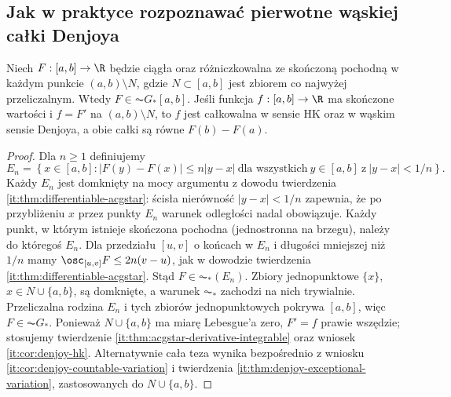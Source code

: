 \subsection{Jak w praktyce rozpoznawać pierwotne wąskiej całki Denjoya}
\begin{twierdzenie}\label{ma1:kh:tw:denjoy-countable}\label{tw:denjoy-countable}
Niech $F:[a,b]\to\R$ będzie ciągła oraz różniczkowalna ze skończoną pochodną w każdym punkcie $(a,b)\setminus N$, gdzie $N\subset[a,b]$ jest zbiorem co najwyżej przeliczalnym. Wtedy $F\in\AC G_*[a,b]$. Jeśli funkcja $f:[a,b]\to\R$ ma skończone wartości i $f=F'$ na $(a,b)\setminus N$, to $f$ jest całkowalna w sensie HK oraz w wąskim sensie Denjoya, a obie całki są równe $F(b)-F(a)$.
\end{twierdzenie}
\begin{proof}
Dla $n\ge1$ definiujemy
\[
 E_n=\left\{x\in[a,b]: |F(y)-F(x)|\le n|y-x|
 \ \text{dla wszystkich}\ y\in[a,b]\ \text{z}\ |y-x|<1/n\right\}.
\]
Każdy $E_n$ jest domknięty na mocy argumentu z dowodu twierdzenia \ref{it:thm:differentiable-acgstar}: ścisła nierówność $|y-x|<1/n$ zapewnia, że po przybliżeniu $x$ przez punkty $E_n$ warunek odległości nadal obowiązuje. Każdy punkt, w którym istnieje skończona pochodna (jednostronna na brzegu), należy do któregoś $E_n$. Dla przedziału $[u,v]$ o końcach w $E_n$ i długości mniejszej niż $1/n$ mamy
$\osc_{[u,v]}F\le2n(v-u)$, jak w dowodzie twierdzenia \ref{it:thm:differentiable-acgstar}. Stąd $F\in\AC_*(E_n)$. Zbiory jednopunktowe $\{x\}$, $x\in N\cup\{a,b\}$, są domknięte, a warunek $\AC_*$ zachodzi na nich trywialnie. Przeliczalna rodzina $E_n$ i tych zbiorów jednopunktowych pokrywa $[a,b]$, więc $F\in\AC G_*$. Ponieważ $N\cup\{a,b\}$ ma miarę Lebesgue'a zero, $F'=f$ prawie wszędzie; stosujemy twierdzenie \ref{it:thm:acgstar-derivative-integrable} oraz wniosek \ref{it:cor:denjoy-hk}. Alternatywnie cała teza wynika bezpośrednio z wniosku \ref{it:cor:denjoy-countable-variation} i twierdzenia \ref{it:thm:denjoy-exceptional-variation}, zastosowanych do $N\cup\{a,b\}$.
\end{proof}
